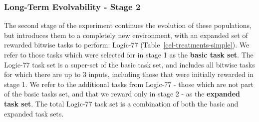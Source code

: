\documentclass[10pt,letterpaper]{article}
\begin{document}
\subsubsection*{Long-Term Evolvability - Stage 2}
The second stage of the experiment continues the evolution of these populations, but introduces them to a completely new environment, with an expanded set of rewarded bitwise tasks to perform: Logic-77 (Table~\ref{cel-treatments-simple}). We refer to those tasks which were selected for in stage 1 as the \textbf{basic task set}. The Logic-77 task set is a super-set of the basic task set, and includes all bitwise tasks for which there are up to 3 inputs, including those that were initially rewarded in stage 1. We refer to the additional tasks from Logic-77 - those which are not part of the basic tasks set, and that we reward only in stage 2 - as the \textbf{expanded task set}. The total Logic-77 task set is a combination of both the basic and expanded task sets.  
\end{document}
